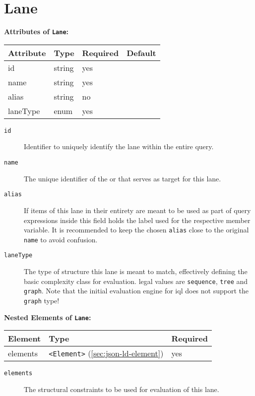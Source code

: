 \documentclass[11pt,a4paper]{report}
\newcommand{\iqlType}[1]{\texttt{\iqlns#1}}
\newcommand{\iqlBaseType}[1]{\texttt{\textless#1\textgreater}}
\newenvironment{attributes}[1]{
	\noindent\textbf{Attributes of #1:}\newline\medskip
	\begin{tabular}{|p{0.3\textwidth}|p{0.20\textwidth}|p{0.20\textwidth}|p{0.17\textwidth}|}
		\hline
		\textbf{Attribute} & \textbf{Type} & \textbf{Required} & \textbf{Default} \\ 
		\hline
		\hline
	}{
	\end{tabular}
}
\newcommand{\attribute}[4]{
	#1 & #2 & #3 & #4 \\
	\hline
}
\newenvironment{elements}[1]{
	\noindent\textbf{Nested Elements of #1:}\newline\medskip
	\begin{tabular}{|p{0.3\textwidth}|p{0.42\textwidth}|p{0.17\textwidth}|}
		\hline
		\textbf{Element} & \textbf{Type} & \textbf{Required} \\ 
		\hline
		\hline
	}{
	\end{tabular}
}
\newcommand{\element}[3]{
	#1 & #2 & #3 \\
	\hline
}
\begin{document}
\section{Lane}
\label{sec:json-ld-lane}
\begin{attributes}{\iqlType{Lane}}
	\attribute{id}{string}{yes}{}
	\attribute{name}{string}{yes}{}
	\attribute{alias}{string}{no}{}
	\attribute{laneType}{enum}{yes}{}
\end{attributes}
\begin{description}
	\item[\iqlType{id}] Identifier to uniquely identify the lane within the entire query.
	\item[\iqlType{name}] The unique identifier of the  or  that serves as target for this lane.
	\item[\iqlType{alias}] If items of this lane in their entirety are meant to be used as part of query expressions inside this field holds the label used for the respective member variable. It is recommended to keep the chosen \texttt{alias} close to the original \texttt{name} to avoid confusion.
	\item[\iqlType{laneType}] The type of structure this lane is meant to match, effectively defining the basic complexity class for evaluation. legal values are \texttt{sequence}, \texttt{tree} and \texttt{graph}. Note that the initial evaluation engine for \ac{iql} does not support the \texttt{graph} type! %
\end{description}
\begin{elements}{\iqlType{Lane}}
	\element{elements}{\iqlBaseType{Element} (\ref{sec:json-ld-element})}{yes}
\end{elements}
\begin{description}
	\item[\iqlType{elements}] The structural constraints to be used for evaluation of this lane.
\end{description}
\end{document}
